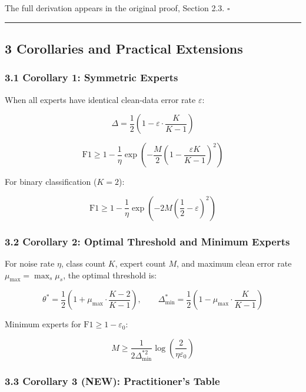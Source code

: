\documentclass[
  12pt,
]{ctexart}
\begin{document}
The full derivation appears in the original proof, Section 2.3.
\(\square\)

\begin{center}\rule{0.5\linewidth}{0.5pt}\end{center}

\subsection{3 Corollaries and Practical
Extensions}\label{corollaries-and-practical-extensions}

\subsubsection{3.1 Corollary 1: Symmetric
Experts}\label{corollary-1-symmetric-experts}

When all experts have identical clean-data error rate \(\varepsilon\):

\[\Delta = \frac{1}{2}\left(1 - \varepsilon \cdot \frac{K}{K-1}\right)\]

\[\text{F1} \geq 1 - \frac{1}{\eta} \exp\!\left(-\frac{M}{2}\left(1 - \frac{\varepsilon K}{K-1}\right)^2\right)\]

For binary classification (\(K=2\)):

\[\text{F1} \geq 1 - \frac{1}{\eta} \exp\!\left(-2M\left(\frac{1}{2} - \varepsilon\right)^2\right)\]

\subsubsection{3.2 Corollary 2: Optimal Threshold and Minimum
Experts}\label{corollary-2-optimal-threshold-and-minimum-experts}

For noise rate \(\eta\), class count \(K\), expert count \(M\), and
maximum clean error rate \(\mu_{\max} = \max_s \mu_s\), the optimal
threshold is:

\[\theta^* = \frac{1}{2}\left(1 + \mu_{\max} \cdot \frac{K-2}{K-1}\right), \qquad
\Delta_{\min}^* = \frac{1}{2}\left(1 - \mu_{\max} \cdot \frac{K}{K-1}\right)\]

Minimum experts for \(\text{F1} \geq 1 - \varepsilon_0\):

\[M \geq \frac{1}{2\Delta_{\min}^{*2}} \log\left(\frac{2}{\eta \varepsilon_0}\right)\]

\subsubsection{3.3 Corollary 3 (NEW): Practitioner's
Table}\label{corollary-3-new-practitioners-table}
\end{document}
